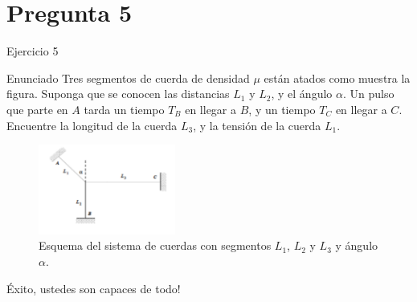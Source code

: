 \documentclass[
    10pt,
    aspectratio=169,
    xcolor={dvipsnames},
    spanish,
    ]{beamer}
\begin{document}
\section{Pregunta 5}
\begin{frame}{Ejercicio 5}
\begin{block}{Enunciado}
  Tres segmentos de cuerda de densidad $\mu$ están atados como muestra la figura. 
Suponga que se conocen las distancias $L_1$ y $L_2$, y el ángulo $\alpha$. 
Un pulso que parte en $A$ tarda un tiempo $T_B$ en llegar a $B$, y un tiempo $T_C$ en llegar a $C$. Encuentre la longitud de la cuerda $L_3$, y la tensión de la cuerda $L_1$.
\end{block}
\begin{figure}[h]
    \centering
    \includegraphics[width=0.4\textwidth]{Auxiliar_5_4}
    \caption{Esquema del sistema de cuerdas con segmentos $L_1$, $L_2$ y $L_3$ y ángulo $\alpha$.}
    \label{fig:cuerdas}
\end{figure}
\end{frame}
\begin{frame}{}
  \centering
  \Huge Éxito, ustedes son capaces de todo!
\end{frame}
\end{document}
